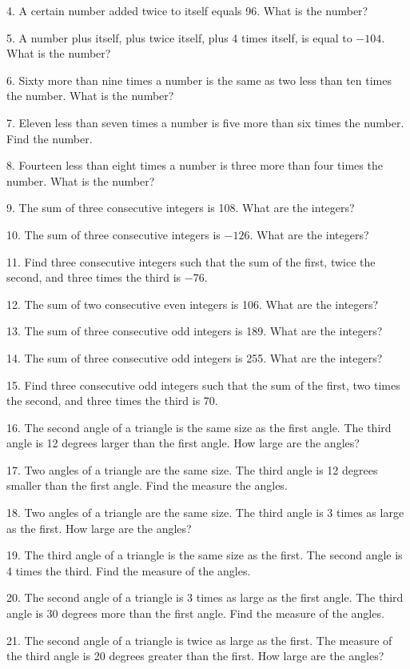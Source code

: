 4. A certain number added twice to itself equals 96. What is the number?

5. A number plus itself, plus twice itself, plus 4 times itself, is equal to
$- 104$. What is the number?

6. Sixty more than nine times a number is the same as two less than ten times
the number. What is the number?

7. Eleven less than seven times a number is five more than six times the
number. Find the number.

8. Fourteen less than eight times a number is three more than four times the number. What is the number?

9. The sum of three consecutive integers is 108. What are the integers?

10. The sum of three consecutive integers is $- 126$. What are the integers?

11. Find three consecutive integers such that the sum of the first, twice the
second, and three times the third is $- 76$.

12. The sum of two consecutive even integers is 106. What are the integers?

13. The sum of three consecutive odd integers is 189. What are the integers?

14. The sum of three consecutive odd integers is 255. What are the integers?

15. Find three consecutive odd integers such that the sum of the first, two
times the second, and three times the third is 70.

16. The second angle of a triangle is the same size as the first angle. The
third angle is 12 degrees larger than the first angle. How
large are the angles?

17. Two angles of a triangle are the same size. The third angle is 12 degrees
smaller than the first angle. Find the measure the
angles.

18. Two angles of a triangle are the same size. The third angle is 3 times as
large as the first. How large are the angles?

19. The third angle of a triangle is the same size as the first. The second
angle is 4 times the third. Find the measure of the angles.

\pagebreak

20. The second angle of a triangle is 3 times as large as the first angle. The
third angle is 30 degrees more than the first angle. Find the
measure of the angles.

21. The second angle of a triangle is twice as large as the first. The measure
of the third angle is 20 degrees greater than the first. How
large are the angles?

